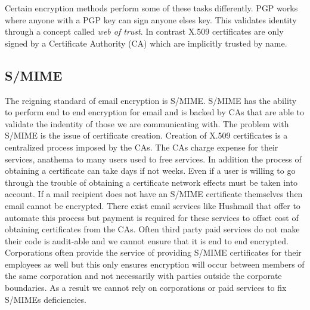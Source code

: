 \documentclass[10pt]{article}
\begin{document}
\begin{multicols}{2}
Certain encryption methods perform some of these tasks differently. PGP works where anyone with a PGP key can sign anyone elses key. This validates identity through a concept called \textit{web of trust}. In contrast X.509 certificates are only signed by a Certificate Authority (CA) which are implicitly trusted by name.

\subsection{S/MIME}
\par The reigning standard of email encryption is S/MIME. S/MIME has the ability to perform end to end encryption for email and is backed by CAs that are able to validate the indentity of those we are communicating with. The problem with S/MIME is the issue of certificate creation. Creation of X.509 certificates is a centralized process imposed by the CAs\cite{garfinkel2005johnny}. The CAs charge expense for their services, anathema to many users used to free services. In addition the process of obtaining a certificate can take days if not weeks. Even if a user is willing to go through the trouble of obtaining a certificate network effects must be taken into account. If a mail recipient does not have an S/MIME certificate themselves then email cannot be encrypted. There exist email services like Hushmail that offer to automate this process but payment is required for these services to offset cost of obtaining certificates from the CAs. Often third party paid services do not make their code is audit-able and we cannot ensure that it is end to end encrypted. Corporations often provide the service of providing S/MIME certificates for their employees as well but this only ensures encryption will occur between members of the same corporation and not necessarily with parties outside the corporate boundaries. As a result we cannot rely on corporations or paid services to fix S/MIMEs deficiencies.

\end{multicols}
\end{document}
